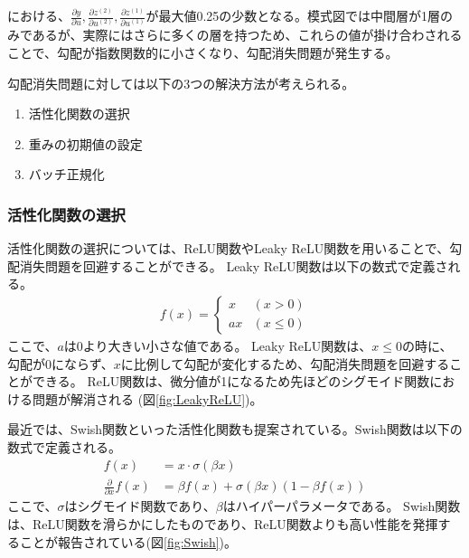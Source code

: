 \documentclass{ltjsarticle}
\begin{document}
における、$\frac{\partial y}{\partial u}, \frac{\partial z^{(2)}}{\partial u^{(2)}}, \frac{\partial z^{(1)}}{\partial u^{(1)}}$が最大値0.25の少数となる。模式図では中間層が1層のみであるが、実際にはさらに多くの層を持つため、これらの値が掛け合わされることで、勾配が指数関数的に小さくなり、勾配消失問題が発生する。
\par
勾配消失問題に対しては以下の3つの解決方法が考えられる。
\begin{enumerate}
  \item 活性化関数の選択
  \item 重みの初期値の設定
  \item バッチ正規化
\end{enumerate}

\subsubsection{活性化関数の選択}
活性化関数の選択については、ReLU関数やLeaky ReLU関数を用いることで、勾配消失問題を回避することができる。
Leaky ReLU関数は以下の数式で定義される。
\begin{align}
  f(x) = \begin{cases}
    x & (x > 0)\\
    ax & (x \leq 0)
  \end{cases}
\end{align}
ここで、$a$は0より大きい小さな値である。
Leaky ReLU関数は、$x \leq 0$の時に、勾配が0にならず、$x$に比例して勾配が変化するため、勾配消失問題を回避することができる。
ReLU関数は、微分値が1になるため先ほどのシグモイド関数における問題が解消される (図\ref{fig:LeakyReLU})。

最近では、Swish関数といった活性化関数も提案されている。Swish関数は以下の数式で定義される。
\begin{align}
  f(x) &= x \cdot \sigma(\beta x)\\
  \frac{\partial}{\partial x}f(x) &= \beta f(x) + \sigma(\beta x) (1 - \beta f(x))
\end{align}
ここで、$\sigma$はシグモイド関数であり、$\beta$はハイパーパラメータである。
Swish関数は、ReLU関数を滑らかにしたものであり、ReLU関数よりも高い性能を発揮することが報告されている(図\ref{fig:Swish})。
\end{document}
